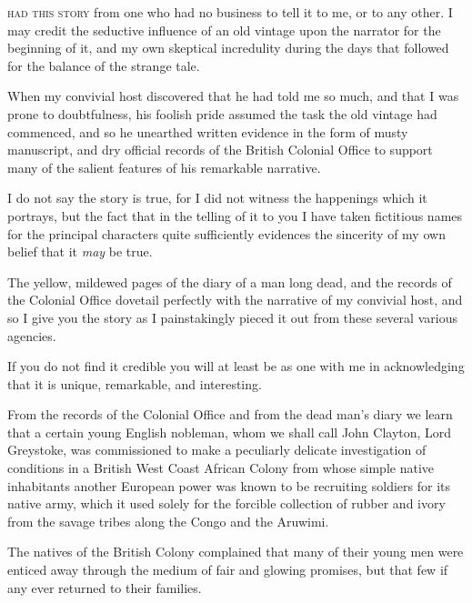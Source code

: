 \label{ch:01}
\begin{ChapterStart}
\vspace*{2\nbs}

\vspace{1.5\nbs}
\end{ChapterStart}

\noindent{} \textsc{had this story} from one who had no business to tell it to me, or to any other. I may credit the seductive influence of an old vintage upon the narrator for the beginning of it, and my own skeptical incredulity during the days that followed for the balance of the strange tale.

When my convivial host discovered that he had told me so much, and that I was prone to doubtfulness, his foolish pride assumed the task the old vintage had commenced, and so he unearthed written evidence in the form of musty manuscript, and dry official records of the British Colonial Office to support many of the salient features of his remarkable narrative.

I do not say the story is true, for I did not witness the happenings which it portrays, but the fact that in the telling of it to you I have taken fictitious names for the principal characters quite sufficiently evidences the sincerity of my own belief that it \emph{may} be true.

The yellow, mildewed pages of the diary of a man long dead, and the records of the Colonial Office dovetail perfectly with the narrative of my convivial host, and so I give you the story as I painstakingly pieced it out from these several various agencies.

If you do not find it credible you will at least be as one with me in acknowledging that it is unique, remarkable, and interesting.

From the records of the Colonial Office and from the dead man's diary we learn that a certain young English nobleman, whom we shall call John Clayton, Lord Greystoke, was commissioned to make a peculiarly delicate investigation of conditions in a British West Coast African Colony from whose simple native inhabitants another European power was known to be recruiting soldiers for its native army, which it used solely for the forcible collection of rubber and ivory from the savage tribes along the Congo and the Aruwimi.

The natives of the British Colony complained that many of their young men were enticed away through the medium of fair and glowing promises, but that few if any ever returned to their families.

